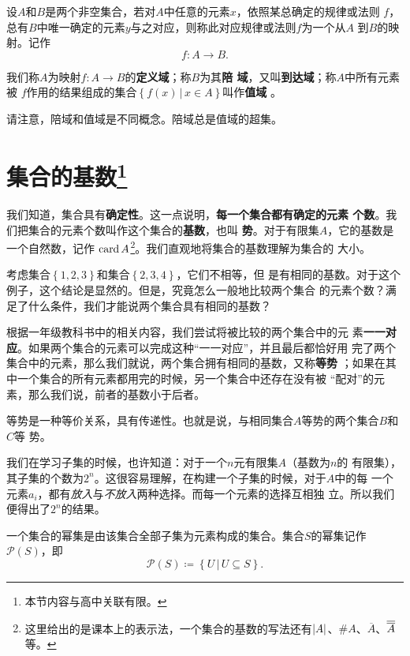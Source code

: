 \begin{rawdef}[映射]
    设$A$和$B$是两个非空集合，若对$A$中任意的元素$x$，依照某总确定的规律或法则
    $f$，总有$B$中唯一确定的元素$y$与之对应，则称此对应规律或法则$f$为一个从$A$
    到$B$的映射。记作
    \[
        f: A \to B.
    \]
\end{rawdef}

我们称$A$为映射$f: A \to B$的\textbf{定义域}；称$B$为其\textbf{陪
域}，又叫\textbf{到达域}；称$A$中所有元素被
$f$作用的结果组成的集合$\left\{ f(x) \,|\, x\in A \right\} $叫作\textbf{值域}
。

请注意，陪域和值域是不同概念。陪域总是值域的超集。


\section[集合的基数]{集合的基数\footnote{本节内容与高中关联有限。}}

我们知道，集合具有\textbf{确定性}。这一点说明，\textbf{每一个集合都有确定的元素
个数}。我们把集合的元素个数叫作这个集合的\textbf{基数}，也叫
\textbf{势}。对于有限集$A$，它的基数是一个自然数，记作
$\operatorname{card}{A}$\footnote{这里给出的是课本上的表示法，一个集合的基数的写法还有$\left|{A}\right|
$、$\# A$、$\overline{A}$、$\overline{\overline{{A}}}$等。}。我们直观地将集合的基数理解为集合的
大小。

考虑集合$\left\{ 1,2,3 \right\} $和集合$\left\{ 2,3,4 \right\} $，它们不相等，但
是有相同的基数。对于这个例子，这个结论是显然的。但是，究竟怎么一般地比较两个集合
的元素个数？满足了什么条件，我们才能说两个集合具有相同的基数？

根据一年级教科书中的相关内容\cite{pep_math_1A}，我们尝试将被比较的两个集合中的元
素\textbf{一一对应}。如果两个集合的元素可以完成这种“一一对应”，并且最后都恰好用
完了两个集合中的元素，那么我们就说，两个集合拥有相同的基数，又称\textbf{等势}
；如果在其中一个集合的所有元素都用完的时候，另一个集合中还存在没有被
“配对”的元素，那么我们说，前者的基数小于后者。

等势是一种等价关系，具有传递性。也就是说，与相同集合$A$等势的两个集合$B$和$C$等
势。

我们在学习子集的时候，也许知道：对于一个$n$元有限集$A$（基数为$n$的
有限集），其子集的个数为$2^n$。这很容易理解，在构建一个子集的时候，对于$A$中的每
一个元素$a_i$，都有\emph{放入}与\emph{不放入}两种选择。而每一个元素的选择互相独
立。所以我们便得出了$2^n$的结果。

\begin{rawdef}[幂集]
    一个集合的幂集是由该集合全部子集为元素构成的集合。集合$S$的幂集记作
    $\mathcal{P}(S)$，即
    \[
        \mathcal{P}(S)\coloneqq \left\{ U \,|\, U \subseteq S \right\}.
    \]
\end{rawdef}

